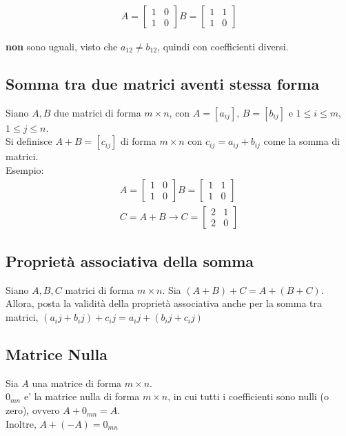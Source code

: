 \documentclass[a4paper, 10pt]{article}
\begin{document}
		\begin{align*}
			A = \begin{bmatrix}
				1 & 0 \\
				1 & 0
			\end{bmatrix}		
			B = \begin{bmatrix}
				1 & 1 \\
				1 & 0
			\end{bmatrix}
		\end{align*}
		
	\textbf{non} sono uguali, visto che $a_{12}\neq b_{12}$, quindi con coefficienti diversi.
	
	\subsection{Somma tra due matrici aventi stessa forma}
	Siano $A,B$ due matrici di forma $m \times n$, con $A = [a_{ij}]$, $B = [b_{ij}]$ e $1 \leq i \leq m$, 
	$1 \leq j \leq n$.\\
	Si definisce $A + B = [c_{ij}]$ di forma $m \times n$ con $c_{ij} = a_{ij} + b_{ij}$ come la somma di
	matrici. \\
	Esempio:
	\begin{align*}
			A = \begin{bmatrix}
				1 & 0 \\
				1 & 0
			\end{bmatrix}					
			B = \begin{bmatrix}
				1 & 1 \\
				1 & 0
			\end{bmatrix}
			\\
			C = A + B \rightarrow
			C = \begin{bmatrix}
				2 & 1 \\
				2 & 0
			\end{bmatrix}
		\end{align*}
	\subsection{Proprietà associativa della somma}
	Siano $A,B,C$ matrici di forma $m \times n$.  
	Sia $(A + B) + C = A + ( B + C)$. Allora, posta la validità della proprietà associativa anche per la 
	somma tra matrici, 
	$(a_ij + b_ij) + c_ij = a_ij + (b_ij + c_ij)$   
	
	\newpage
	\subsection{Matrice Nulla}
	Sia $A$ una matrice di forma $m \times n$.\\
	$0_{mn}$ e' la matrice nulla di forma $m \times n$, in cui tutti i coefficienti sono nulli (o zero), 
	ovvero $A + 0_{mn} = A$. \\
	Inoltre, $A + (-A) = 0_{mn}$
	
\end{document}
